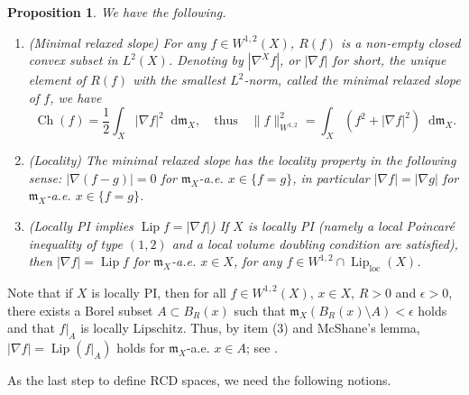 \documentclass[11pt,reqno]{amsart}
\newtheorem{proposition}[theorem]{Proposition}
\theoremstyle{definition}
\numberwithin{equation}{section}
\newcommand{\di}{\mathop{}\!\mathrm{d}}
\newcommand{\meas}{\mathfrak{m}}
\DeclareMathOperator{\Ch}{Ch}
\DeclareMathOperator{\Lip}{Lip}
\DeclareMathOperator{\loc}{loc}
\begin{document}
\begin{proposition}\label{proplocality}
We have the following.
\begin{enumerate}
    \item{(Minimal relaxed slope)} For any $f \in W^{1,2}(X)$, $R(f)$ is a  non-empty closed convex subset in $L^2(X)$. Denoting by $|\nabla^Xf|$, or $|\nabla f|$ for short, the unique element of $R(f)$ with the smallest $L^2$-norm, called the \textit{minimal relaxed slope} of $f$, we have
    \begin{equation*}
\Ch(f)=\frac{1}{2}\int_X|\nabla f|^2\di \meas_X,\quad \text{thus} \quad \|f\|_{W^{1,2}}^2=\int_X\left(f^2+|\nabla f|^2\right) \di \meas_X.
\end{equation*}
\item{(Locality)} The minimal relaxed slope has the locality property in the following sense:
$
    |\nabla (f-g)|=0$
    for $\meas_X$-a.e. $x \in \{f=g\}$,
in particular
$
    |\nabla f|=|\nabla g|$ for $\meas_X$-a.e. $x \in \{f=g\}$.
\item{(Locally PI implies $\Lip f=|\nabla f|$)} If $X$ is locally PI (namely a local Poincar\'e inequality of type $(1,2)$ and a local volume doubling condition are satisfied), then 
$
    |\nabla f|=\Lip f$ for $\meas_X$-a.e. $x \in X$,
for any $f \in W^{1,2}\cap \Lip _{\loc}(X)$.
\end{enumerate}
\end{proposition}
Note that
    if $X$ is locally PI, then for all $f \in W^{1,2}(X)$, $x \in X$, $R>0$ and $\epsilon>0$, there exists a Borel subset $A\subset B_R(x)$ such that $\meas_X(B_R(x) \setminus A)<\epsilon$ holds and that $f|_A$ is locally Lipschitz. Thus, by item (3) and McShane's lemma, $|\nabla f| = \Lip (f|_A)$ holds for $\meas_X$-a.e. $x \in A$; see \cite{Chee}. 

As the last step to define RCD spaces, we need the following notions.
\end{document}
